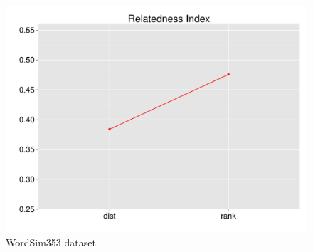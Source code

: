 \documentclass[t]{beamer} %
\begin{document}
\begin{frame}
\begin{columns}
\begin{column}{0.5\textwidth}
      \begin{figure}
        \hspace*{-18pt}   
        \includegraphics[scale=0.30]{img/lapesa_ws_main_relindex}
        \vspace{-10pt}
        \caption{WordSim353 dataset}
      \end{figure}
      
    \end{column}
  \end{columns}  
  
\end{frame}
\end{document}
